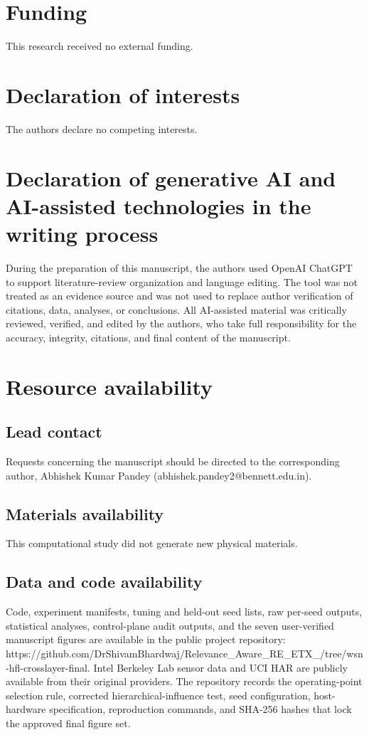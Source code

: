 \documentclass[11pt]{article}
\begin{document}
\section{Funding}
This research received no external funding.\par
\section{Declaration of interests}
The authors declare no competing interests.\par
\section{Declaration of generative AI and AI-assisted technologies in the writing process}
During the preparation of this manuscript, the authors used OpenAI ChatGPT to support literature-review organization and language editing. The tool was not treated as an evidence source and was not used to replace author verification of citations, data, analyses, or conclusions. All AI-assisted material was critically reviewed, verified, and edited by the authors, who take full responsibility for the accuracy, integrity, citations, and final content of the manuscript.\par
\section*{Resource availability}
\subsection*{Lead contact}
Requests concerning the manuscript should be directed to the corresponding author, Abhishek Kumar Pandey (abhishek.pandey2@bennett.edu.in).\par
\subsection*{Materials availability}
This computational study did not generate new physical materials.\par
\subsection*{Data and code availability}
Code, experiment manifests, tuning and held-out seed lists, raw per-seed outputs, statistical analyses, control-plane audit outputs, and the seven user-verified manuscript figures are available in the public project repository: https://github.com/DrShivamBhardwaj/Relevance\_Aware\_RE\_ETX\_/tree/wsn-hfl-crosslayer-final. Intel Berkeley Lab sensor data and UCI HAR are publicly available from their original providers. The repository records the operating-point selection rule, corrected hierarchical-influence test, seed configuration, host-hardware specification, reproduction commands, and SHA-256 hashes that lock the approved final figure set.\par
\end{document}
